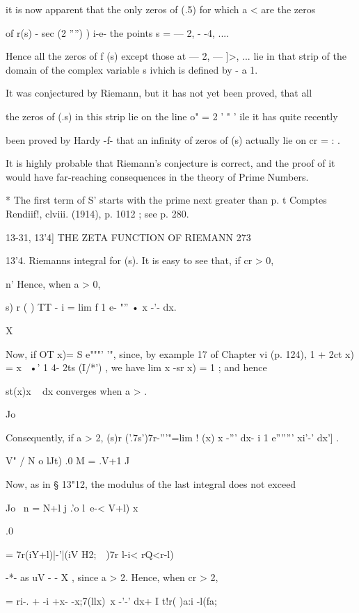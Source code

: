 it is now apparent that the only zeros of (.5) for which a < are the
zeros

of r(s) - sec (2 '''') ) i-e- the points s = — 2, - -4, ....

Hence all the zeros of f (s) except those at — 2, — ]>, ... lie in
that strip of the domain of the complex variable s ivhich is defined
by - a 1.

It was conjectured by Riemann, but it has not yet been proved, that
all

the zeros of (.s) in this strip lie on the line o" = 2 ' " ' ile it
has quite recently

been proved by Hardy -f- that an infinity of zeros of (s) actually lie
on cr = : .

It is highly probable that Riemann's conjecture is correct, and the
proof of it would have far-reaching consequences in the theory of
Prime Numbers.

* The first term of S' starts with the prime next greater than p. t
Comptes Rendiif!, clviii. (1914), p. 1012 ; see p. 280.



13-31, 13'4] THE ZETA FUNCTION OF RIEMANN 273

13'4. Riemanns integral for (s). It is easy to see that, if cr > 0,



n' Hence, when a > 0,



   s) r ( ) TT - i = lim f 1 e- "'' • x -'- dx.

X

Now, if OT x)= S e"""' '", since, by example 17 of Chapter vi (p.
124), 1 + 2ct x) = x~ •' 1 4- 2ts (I/*') , we have lim x -sr x) = 1 ;
and hence

 st(x)x ~ dx converges when a > .

Jo

Consequently, if a > 2, (s)r ('.7s')7r-'''"=lim ! (x) x -''' dx- i 1
e''''''' xi'-' dx'] .

V" / N o lJt) .0 M = .V+1 J

Now, as in § 13"12, the modulus of the last integral does not exceed

Jo \ n = N+l j .'o l\ e-< V+l) x

.0

= 7r(iY+l)|-'|(iV H2;\ \ )7r l-i< rQ<r-l)

-*- as uV - - X , since a > 2. Hence, when cr > 2,

= ri-. + -i +x- -x;7(llx)\ x -'-' dx+ I t!r( )a:i -l(fa;

